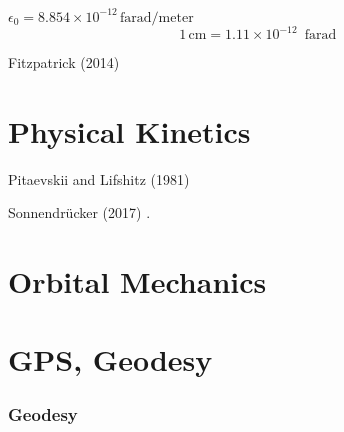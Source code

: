 \documentclass[10pt]{amsart}
\begin{document}
\begin{multicols*}{2}
$\epsilon_0 = 8.854 \times 10^{-12} \, \text{farad}/\text{meter}$
\[
\boxed{ 1 \, \text{cm} = 1.11 \times 10^{-12} \, \text{ farad }} 
\]



Fitzpatrick (2014) \cite{Fitz2014}

\part{Physical Kinetics}



Pitaevskii and Lifshitz (1981) \cite{PL1981}




Sonnendr\"{u}cker (2017) \cite{Sonn2017}.  



\part{Orbital Mechanics}




\part{GPS, Geodesy} 

\section{Geodesy}



\end{multicols*}
\end{document}
